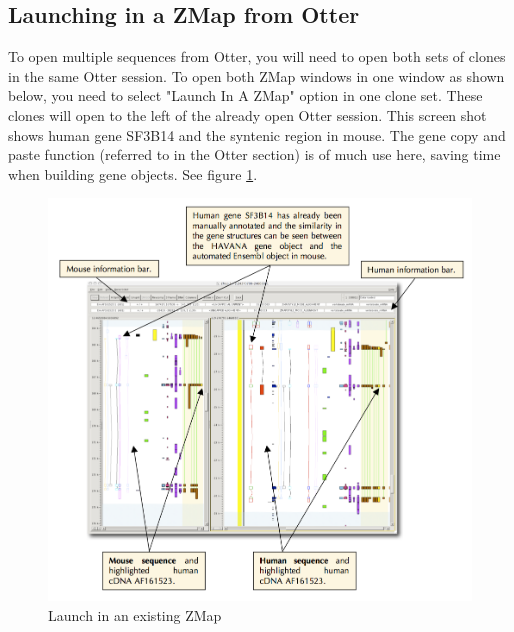 \documentclass[letterpaper]{article}
\begin{document}
\subsection{Launching in a ZMap from Otter}
To open multiple sequences from Otter, you will need to open both sets of clones in the same Otter session. To open both ZMap windows in one window as shown below, you need to select "Launch In A ZMap" option in one clone set. These clones will open to the left of the already open Otter session. This screen shot shows human gene SF3B14 and the syntenic region in mouse. The gene copy and paste function (referred to in the Otter section) is of much use here, saving time when building gene objects. See figure \ref{img_launch_in_zmap}.

\begin{figure}
\centering
\color[rgb]{0.30980393,0.5058824,0.7411765}
\includegraphics[width=15.231cm]{img_launch_in_zmap.png}
\caption{Launch in an existing ZMap}
\label{img_launch_in_zmap}
\end{figure}


\clearpage
\end{document}

